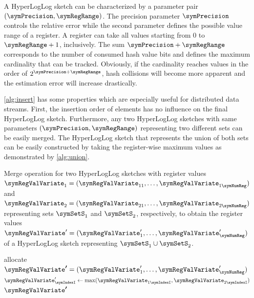 \documentclass[a4paper]{scrartcl}
\newcommand{\comm}[2]{{\Comment{\parbox[t]{#1\linewidth}{{#2}}}}}
\begin{document}
A HyperLogLog sketch can be characterized by a parameter pair $(\symPrecision, \symRegRange)$. The precision parameter $\symPrecision$ controls the relative error while the second parameter defines the possible value range of a register. A register can take all values starting from 0 to $\symRegRange+1$, inclusively. The sum $\symPrecision+\symRegRange$ corresponds to the number of consumed hash value bits and defines the maximum cardinality that can be tracked. Obviously, if the cardinality reaches values in the order of $2^{\symPrecision+\symRegRange}$, hash collisions will become more apparent and the estimation error will increase drastically.

\cref{alg:insert} has some properties which are especially useful for distributed data streams. First, the insertion order of elements has no influence on the final HyperLogLog sketch. Furthermore, any two HyperLogLog sketches with same parameters $(\symPrecision, \symRegRange)$ representing two different sets can be easily merged. The HyperLogLog sketch that represents the union of both sets can be easily constructed by taking the register-wise maximum values as demonstrated by \cref{alg:union}.

\begin{algorithm}
\caption{Merge operation for two HyperLogLog sketches with register values $\boldsymbol{\symRegValVariate}_1 = (\symRegValVariate_{11},\ldots,\symRegValVariate_{1\symNumReg})$ and
$\boldsymbol{\symRegValVariate}_2 = (\symRegValVariate_{21},\ldots,\symRegValVariate_{2\symNumReg})$ representing sets $\symSetS_1$ and $\symSetS_2$, respectively, to obtain the register values $\boldsymbol{\symRegValVariate}' = (\symRegValVariate'_{1},\ldots,\symRegValVariate'_{\symNumReg})$ of a HyperLogLog sketch representing $\symSetS_1\cup\symSetS_2$.}
\label{alg:union}
\begin{algorithmic}
\comm{.4}{$\boldsymbol{\symRegValVariate}_1,\boldsymbol{\symRegValVariate}_2\in\lbrace 0,1,\ldots,\symRegRange+1\rbrace^\symNumReg$}
\State allocate $\boldsymbol{\symRegValVariate'} = (\symRegValVariate'_{1},\ldots,\symRegValVariate'_{\symNumReg})$
\comm{.4}{$\boldsymbol{\symRegValVariate}'\in\lbrace 0,1,\ldots,\symRegRange+1\rbrace^\symNumReg$}
\State $\symRegValVariate'_{\symIndexI}
\gets\max(\symRegValVariate_{1\symIndexI},\symRegValVariate_{2\symIndexI})$
\EndFor
\State \Return $\boldsymbol{\symRegValVariate'}$
\EndFunction
\end{algorithmic}
\end{algorithm}
\end{document}
